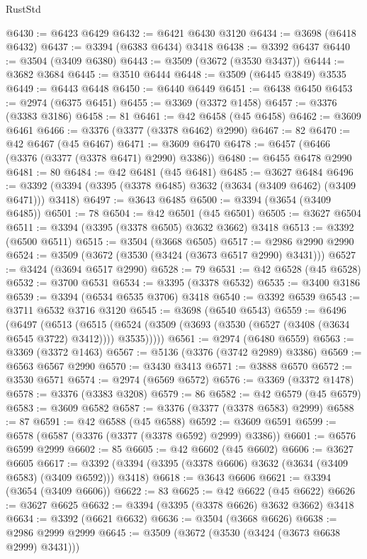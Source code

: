 \begin{lexlean}{RustStd}
\begin{coremodule}
@6430 := @6423 @6429
@6432 := @6421 @6430 @3120
@6434 := @3698 (@6418 @6432)
@6437 := @3394 (@6383 @6434) @3418
@6438 := @3392 @6437
@6440 := @3504 (@3409 @6380)
@6443 := @3509 (@3672 (@3530 @3437))
@6444 := @3682 @3684
@6445 := @3510 @6444
@6448 := @3509 (@6445 @3849) @3535
@6449 := @6443 @6448
@6450 := @6440 @6449
@6451 := @6438 @6450
@6453 := @2974 (@6375 @6451)
@6455 := @3369 (@3372 @1458)
@6457 := @3376 (@3383 @3186)
@6458 := 81
@6461 := @42 @6458 (@45 @6458)
@6462 := @3609 @6461
@6466 := @3376 (@3377 (@3378 @6462) @2990)
@6467 := 82
@6470 := @42 @6467 (@45 @6467)
@6471 := @3609 @6470
@6478 := @6457 (@6466 (@3376 (@3377 (@3378 @6471) @2990) @3386))
@6480 := @6455 @6478 @2990
@6481 := 80
@6484 := @42 @6481 (@45 @6481)
@6485 := @3627 @6484
@6496 := @3392 (@3394 (@3395 (@3378 @6485) @3632 (@3634 (@3409 @6462) (@3409 @6471))) @3418)
@6497 := @3643 @6485
@6500 := @3394 (@3654 (@3409 @6485))
@6501 := 78
@6504 := @42 @6501 (@45 @6501)
@6505 := @3627 @6504
@6511 := @3394 (@3395 (@3378 @6505) @3632 @3662) @3418
@6513 := @3392 (@6500 @6511)
@6515 := @3504 (@3668 @6505)
@6517 := @2986 @2990 @2990
@6524 := @3509 (@3672 (@3530 (@3424 (@3673 @6517 @2990) @3431)))
@6527 := @3424 (@3694 @6517 @2990)
@6528 := 79
@6531 := @42 @6528 (@45 @6528)
@6532 := @3700 @6531
@6534 := @3395 (@3378 @6532)
@6535 := @3400 @3186
@6539 := @3394 (@6534 @6535 @3706) @3418
@6540 := @3392 @6539
@6543 := @3711 @6532 @3716 @3120
@6545 := @3698 (@6540 @6543)
@6559 := @6496
    (@6497
      (@6513
        (@6515 (@6524 (@3509 (@3693 (@3530 (@6527 (@3408 (@3634 @6545 @3722) @3412)))) @3535)))))
@6561 := @2974 (@6480 @6559)
@6563 := @3369 (@3372 @1463)
@6567 := @5136 (@3376 (@3742 @2989) @3386)
@6569 := @6563 @6567 @2990
@6570 := @3430 @3413
@6571 := @3888 @6570
@6572 := @3530 @6571
@6574 := @2974 (@6569 @6572)
@6576 := @3369 (@3372 @1478)
@6578 := @3376 (@3383 @3208)
@6579 := 86
@6582 := @42 @6579 (@45 @6579)
@6583 := @3609 @6582
@6587 := @3376 (@3377 (@3378 @6583) @2999)
@6588 := 87
@6591 := @42 @6588 (@45 @6588)
@6592 := @3609 @6591
@6599 := @6578 (@6587 (@3376 (@3377 (@3378 @6592) @2999) @3386))
@6601 := @6576 @6599 @2999
@6602 := 85
@6605 := @42 @6602 (@45 @6602)
@6606 := @3627 @6605
@6617 := @3392 (@3394 (@3395 (@3378 @6606) @3632 (@3634 (@3409 @6583) (@3409 @6592))) @3418)
@6618 := @3643 @6606
@6621 := @3394 (@3654 (@3409 @6606))
@6622 := 83
@6625 := @42 @6622 (@45 @6622)
@6626 := @3627 @6625
@6632 := @3394 (@3395 (@3378 @6626) @3632 @3662) @3418
@6634 := @3392 (@6621 @6632)
@6636 := @3504 (@3668 @6626)
@6638 := @2986 @2999 @2999
@6645 := @3509 (@3672 (@3530 (@3424 (@3673 @6638 @2999) @3431)))

\end{coremodule}
\end{lexlean}
